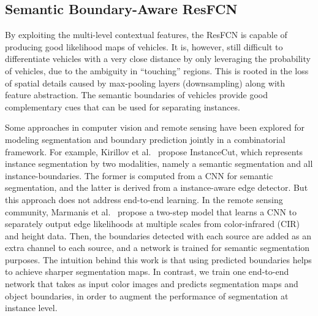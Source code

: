 \documentclass[journal]{IEEEtran}
\begin{document}
\subsection{Semantic Boundary-Aware ResFCN}
\label{sec:c}
By exploiting the multi-level contextual features, the ResFCN is capable of producing good likelihood maps of vehicles. It is, however, still difficult to differentiate vehicles with a very close distance by only leveraging the probability of vehicles, due to the ambiguity in ``touching'' regions. This is rooted in the loss of spatial details caused by max-pooling layers (downsampling) along with feature abstraction. The semantic boundaries of vehicles provide good complementary cues that can be used for separating instances.
\par
Some approaches in computer vision and remote sensing have been explored for modeling segmentation and boundary prediction jointly in a combinatorial framework. For example, Kirillov et al.~\cite{Kirillov17} propose InstanceCut, which represents instance segmentation by two modalities, namely a semantic segmentation and all instance-boundaries. The former is computed from a CNN for semantic segmentation, and the latter is derived from a instance-aware edge detector. But this approach does not address end-to-end learning. In the remote sensing community, Marmanis et al.~\cite{Marmanis18} propose a two-step model that learns a CNN to separately output edge likelihoods at multiple scales from color-infrared (CIR) and height data. Then, the boundaries detected with each source are added as an extra channel to each source, and a network is trained for semantic segmentation purposes. The intuition behind this work is that using predicted boundaries helps to achieve sharper segmentation maps. In contrast, we train one end-to-end network that takes as input color images and predicts segmentation maps and object boundaries, in order to augment the performance of segmentation at instance level.
\par
\end{document}
